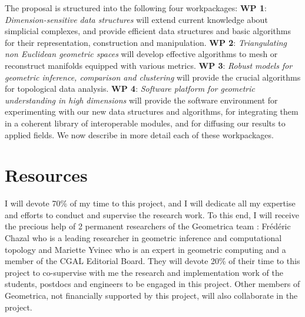 The proposal is structured into the following four workpackages:
{\bf WP 1}:  {\em Dimension-sensitive data  structures} will extend current knowledge about simplicial complexes, and  provide efficient data structures and basic algorithms for their representation, construction and manipulation. 
  {\bf WP 2}:  {\em Triangulating non Euclidean geometric spaces} will develop effective algorithms to mesh or reconstruct manifolds equipped with various metrics.   {\bf WP 3}: {\em Robust models for geometric inference, comparison and  clustering} will provide the crucial  algorithms for topological data analysis.
 {\bf WP 4}:  {\em  Software platform for geometric understanding in high dimensions} will provide the software environment for experimenting with our new data structures and algorithms, for integrating them in a coherent library of interoperable modules, and for diffusing our results to applied fields. We now describe in more detail each of these workpackages.











\section{Resources}

I will devote 70\% of my time to this project, and I will dedicate all my expertise and efforts to conduct and supervise the research work. To this end, I will receive the precious help of 2 permanent researchers of the Geometrica team : Fr\'ed\'eric Chazal who is a  leading researcher in geometric inference and computational topology and Mariette Yvinec who is an expert in geometric computing and a member of the CGAL Editorial Board. They will devote 20\% of their time to this project to co-supervise with me the research and implementation work of the students, postdocs and engineers to be engaged in this project. Other members of Geometrica,
not financially supported by this project, will also collaborate in the project.

